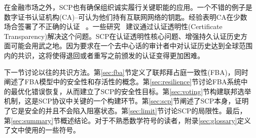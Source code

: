 在金融市场之外，SCP也有确保组织诚实履行关键职能的应用。一个不错的例子是数字证书认证机构(CA)--可认为他们持有互联网网络的钥匙。经验表明CA在少数场合签署了不正确的认证~\cite{ac_ms2013,dc_google2015} 。一些研究~\cite{Kim:2013up,ct_google2013,Basin:2014bn,cryptoeprint:2014:1004} 建议通过认证透明性(Certificate Transparency)解决这个问题。SCP在认证透明性核心问题、增强持久认证历史方面可能会用武之地。因为要求在一个去中心话的审计者中对认证历史达到全球范围内的共识，这将使得退回或者重写之前颁发的认证变得更加困难。

下一节讨论以往的共识方法。第\ref{sec:fba}节定义了联邦拜占庭一致性(FBA)，同时阐述了FBA模型中的安全性和存活性的概念。第\ref{sec:resilience}节讨论FBA系统中的最优化错误恢复，从而建立了SCP的安全性目标。第\ref{sec:voting}节构建联邦选举机制，这是SCP协议中关键的一个构建环节。第\ref{sec:scp}节阐述了SCP本身，证明了它是安全的并且不会陷入阻塞状态。第\ref{sec:limit}节讨论SCP的局限性。最后，第\ref{sec:summary}节概述结论。对于不熟悉数学符号的读者，附录\ref{sec:glossary}定义了文中使用的一些符号。